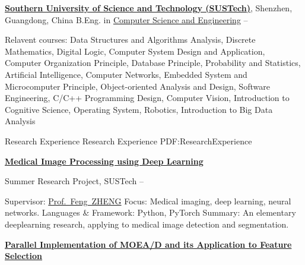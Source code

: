 \documentclass[a4paper,MMMyyyy,nonstopmode]{simpleresumecv}
\begin{document}
\begin{Body}
    \Entry
    \href{https://www.sustech.edu.cn/}
    {\textbf{Southern University of Science and Technology (SUSTech)}},
    Shenzhen, Guangdong, China
    \Gap
    \BulletItem
    B.Eng. in
    \href{http://cse.sustech.edu.cn/}
    {Computer Science and Engineering}
    \hfill
     --
    \begin{Detail}
        \SubBulletItem
        Relavent courses:
        Data Structures and Algorithms Analysis,
        Discrete Mathematics,
        Digital Logic,
        Computer System Design and Application,
        Computer Organization Principle,
        Database Principle,
        Probability and Statistics,
        Artificial Intelligence,
        Computer Networks,
        Embedded System and Microcomputer Principle,
        Object-oriented Analysis and Design,
        Software Engineering,
        C/C++ Programming Design,
        Computer Vision,
        Introduction to Cognitive Science,
        Operating System,
        Robotics,
        Introduction to Big Data Analysis
    \end{Detail}


    \Section
    {Research Experience}
    {Research Experience}
    {PDF:ResearchExperience}

    \Entry
    \href{https://github.com/hackroid/cv-xmp}
    {\textbf{Medical Image Processing using Deep Learning}}

    \BulletItem
    Summer Research Project, SUSTech
    \hfill
     --
    \begin{Detail}
        \SubBulletItem
        Supervisor:
        \href{https://faculty.sustech.edu.cn/fengzheng/en/}{Prof.~Feng~ZHENG}
        \SubBulletItem
        Focus:
        Medical imaging, deep learning, neural networks.
        \SubBulletItem
        Languages \& Framework: Python, PyTorch
        \SubBulletItem
        Summary:
        An elementary deeplearning research, applying to medical image detection and segmentation.
    \end{Detail}

    \Entry
    \href{https://github.com/hackroid/pMOEA-D}
    {\textbf{Parallel Implementation of MOEA/D and its Application to Feature Selection}}


\end{Body}
\end{document}
